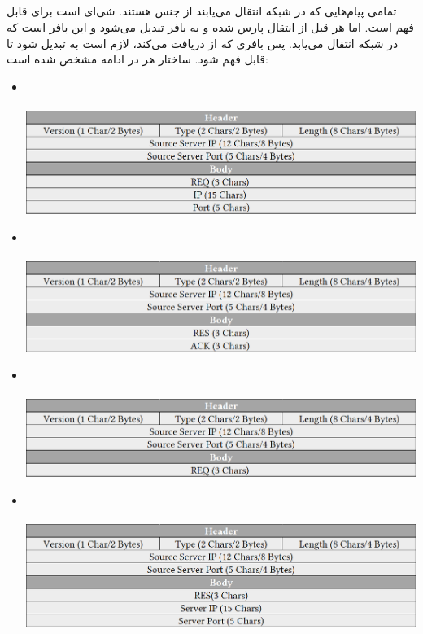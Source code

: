 \documentclass{article}
\begin{document}
\subsection{}
تمامی پیام‌هایی که در شبکه انتقال می‌یابند از جنس  هستند.  شی‌ای است برای  قابل فهم است. اما هر  قبل از انتقال پارس شده و به بافر تبدیل می‌شود و این بافر است که در شبکه انتقال می‌یابد. پس بافری که  از  دریافت می‌کند، لازم است به  تبدیل شود تا قابل فهم شود.
ساختار هر  در ادامه مشخص شده است:
\begin{itemize}
\newpage
	\item {}\\\\
		\includegraphics{RegisterRequest}
	\item {}\\\\
		\includegraphics{RegisterResponse}	
	\item {}\\\\
		\includegraphics{AdvertiseRequest}	
	\item {}\\\\
		\includegraphics{AdvertiseResponse}	

\end{itemize}
\end{document}

